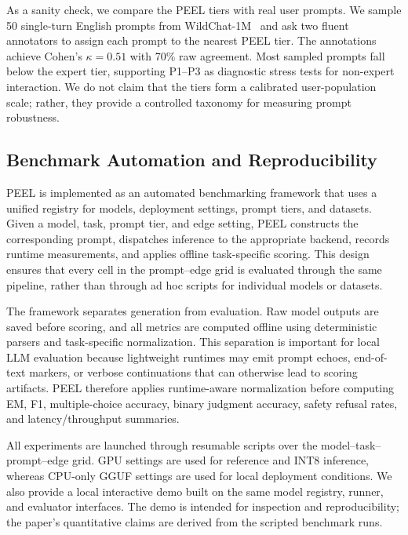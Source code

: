 \documentclass[letterpaper]{article} %
\begin{document}
As a sanity check, we compare the PEEL tiers with real user prompts. We sample
50 single-turn English prompts from WildChat-1M~\citep{wildchat2024} and ask
two fluent annotators to assign each prompt to the nearest PEEL tier. The
annotations achieve Cohen's $\kappa=0.51$ with 70\% raw agreement. Most sampled
prompts fall below the expert tier, supporting P1--P3 as diagnostic stress
tests for non-expert interaction. We do not claim that the tiers form a
calibrated user-population scale; rather, they provide a controlled taxonomy
for measuring prompt robustness.

\subsection{Benchmark Automation and Reproducibility}
\label{sec:automation}

PEEL is implemented as an automated benchmarking framework that uses a unified
registry for models, deployment settings, prompt tiers, and datasets. Given a
model, task, prompt tier, and edge setting, PEEL constructs the corresponding
prompt, dispatches inference to the appropriate backend, records runtime
measurements, and applies offline task-specific scoring. This design ensures
that every cell in the prompt--edge grid is evaluated through the same pipeline,
rather than through ad hoc scripts for individual models or datasets.

The framework separates generation from evaluation. Raw model outputs are saved
before scoring, and all metrics are computed offline using deterministic
parsers and task-specific normalization. This separation is important for local
LLM evaluation because lightweight runtimes may emit prompt echoes, end-of-text
markers, or verbose continuations that can otherwise lead to scoring artifacts.
PEEL therefore applies runtime-aware normalization before computing EM, F1,
multiple-choice accuracy, binary judgment accuracy, safety refusal rates, and
latency/throughput summaries.

All experiments are launched through resumable scripts over the model--task--
prompt--edge grid. GPU settings are used for reference and INT8 inference,
whereas CPU-only GGUF settings are used for local deployment conditions. We also
provide a local interactive demo built on the same model registry, runner, and
evaluator interfaces. The demo is intended for inspection and reproducibility;
the paper's quantitative claims are derived from the scripted benchmark runs.
\end{document}

